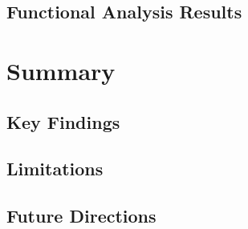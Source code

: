 \documentclass[11pt, a4paper]{article}
\begin{document}
\subsection{Functional Analysis Results}

\section{Summary}
\label{sec:summary}

%

\subsection{Key Findings}

\subsection{Limitations}

\subsection{Future Directions}

\newpage



\end{document}
